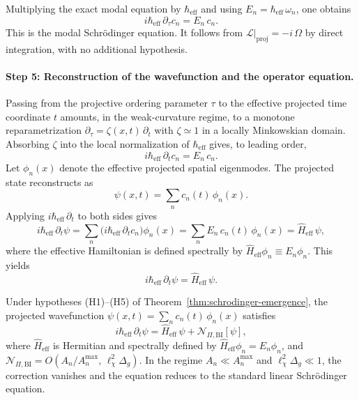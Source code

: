       Multiplying the exact modal equation by $\hbar_{\mathrm{eff}}$ and using
      $E_n = \hbar_{\mathrm{eff}}\,\omega_n$, one obtains
      \[
        i\hbar_{\mathrm{eff}}\,\partial_\tau c_n = E_n\,c_n.
      \]
      This is the modal Schr\"{o}dinger equation.
      It follows from $\mathcal{L}|_{\mathrm{proj}} = -i\,\Omega$ by direct integration,
      with no additional hypothesis.

    \paragraph{Step 5: Reconstruction of the wavefunction and the operator equation.}

      Passing from the projective ordering parameter $\tau$ to the effective projected time
      coordinate $t$ amounts, in the weak-curvature regime, to a monotone reparametrization
      $\partial_{\tau} = \zeta(x,t)\,\partial_t$ with $\zeta \simeq 1$ in a locally
      Minkowskian domain.
      Absorbing $\zeta$ into the local normalization of $\hbar_{\mathrm{eff}}$ gives, to
      leading order,
      \[
        i\hbar_{\mathrm{eff}}\,\partial_t c_n = E_n\,c_n.
      \]
      Let $\phi_n(x)$ denote the effective projected spatial eigenmodes.
      The projected state reconstructs as
      \[
        \psi(x,t) = \sum_n c_n(t)\,\phi_n(x).
      \]
      Applying $i\hbar_{\mathrm{eff}}\,\partial_t$ to both sides gives
      \[
        i\hbar_{\mathrm{eff}}\,\partial_t\psi
        = \sum_n \bigl(i\hbar_{\mathrm{eff}}\,\partial_t c_n\bigr)\phi_n(x)
        = \sum_n E_n\,c_n(t)\,\phi_n(x)
        = \hat{H}_{\mathrm{eff}}\,\psi,
      \]
      where the effective Hamiltonian is defined spectrally by
      $\hat{H}_{\mathrm{eff}}\phi_n \equiv E_n\phi_n$.
      This yields
      \[
        \boxed{i\hbar_{\mathrm{eff}}\,\partial_t\psi = \hat{H}_{\mathrm{eff}}\,\psi.}
      \]

    \begin{proposition}
    Under hypotheses \textup{(H1)--(H5)} of Theorem~\ref{thm:schrodinger-emergence},
    the projected wavefunction $\psi(x,t) = \sum_n c_n(t)\,\phi_n(x)$ satisfies
    \[
      i\hbar_{\mathrm{eff}}\,\partial_t\psi
      = \hat{H}_{\mathrm{eff}}\,\psi + \mathcal{N}_{\Pi,\mathrm{BI}}[\psi],
    \]
    where $\hat{H}_{\mathrm{eff}}$ is Hermitian and spectrally defined by
    $\hat{H}_{\mathrm{eff}}\phi_n = E_n\phi_n$, and
    $\mathcal{N}_{\Pi,\mathrm{BI}} = O(A_n/A_n^{\max},\,\ell_\chi^2\Delta_g)$.
    In the regime $A_n \ll A_n^{\max}$ and $\ell_\chi^2\Delta_g \ll 1$, the correction
    vanishes and the equation reduces to the standard linear Schr\"{o}dinger equation.
      \end{proposition}

